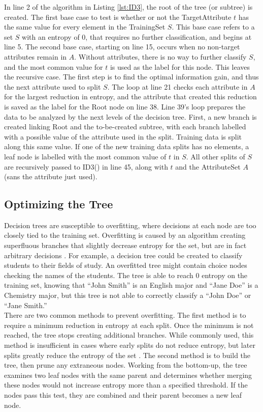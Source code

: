In line 2 of the algorithm in Listing \ref{lst:ID3}, the root of the tree (or subtree) is created. The first base case to test is whether or not the TargetAttribute $t$ has the same value for every element in the TrainingSet $S$. This base case refers to a set $S$ with an entropy of 0, that requires no further classification, and begins at line 5. The second base case, starting on line 15, occurs when no non-target attributes remain in $A$. Without attributes, there is no way to further classify $S$, and the most common value for $t$ is used as the label for this node. This leaves the recursive case. The first step is to find the optimal information gain, and thus the next attribute used to split $S$. The loop at line 21 checks each attribute in $A$ for the largest reduction in entropy, and the attribute that created this reduction is saved as the label for the Root node on line 38. Line 39's loop prepares the data to be analyzed by the next levels of the decision tree. First, a new branch is created linking Root and the to-be-created subtree, with each branch labelled with a possible value of the attribute used in the split. Training data is split along this same value. If one of the new training data splits has no elements, a leaf node is labelled with the most common value of $t$ in $S$. All other splits of $S$ are recursively passed to ID3() in line 45, along with $t$ and the AttributeSet $A$ (sans the attribute just used). 

\subsection{Optimizing the Tree}
Decision trees are susceptible to overfitting, where decisions at each node are too closely tied to the training set. Overfitting is caused by an algorithm creating superfluous branches that slightly decrease entropy for the set, but are in fact arbitrary decisions \cite{sega07}. For example, a decision tree could be created to classify students to their fields of study. An overfitted tree might contain choice nodes checking the names of the students. The tree is able to reach 0 entropy on the training set, knowing that ``John Smith'' is an English major and ``Jane Doe'' is a Chemistry major, but this tree is not able to correctly classify a ``John Doe'' or ``Jane Smith.''\\

There are two common methods to prevent overfitting. The first method is to require a minimum reduction in entropy at each split. Once the minimum is not reached, the tree stops creating additional branches. While commonly used, this method is insufficient in cases where early splits do not reduce entropy, but later splits greatly reduce the entropy of the set \cite{sega07}. The second method is to build the tree, then prune any extraneous nodes. Working from the bottom-up, the tree examines two leaf nodes with the same parent and determines whether merging these nodes would not increase entropy more than a specified threshold. If the nodes pass this test, they are combined and their parent becomes a new leaf node.\\

